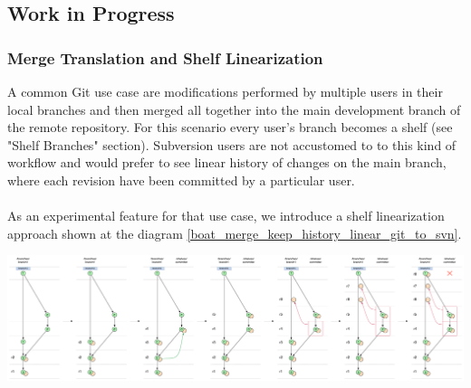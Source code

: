 \subsection{Work in Progress}

\subsubsection{Merge Translation and Shelf Linearization}

A common Git use case are modifications performed by multiple users in their local branches and then merged all together into the main development branch of the remote repository. 
For this scenario every user's branch becomes a shelf (see "Shelf Branches" section). Subversion users are not accustomed to
to this kind of workflow and would prefer to see linear history of changes on the main branch, where each revision have been committed by a particular user.
\\\\
As an experimental feature for that use case, we introduce a shelf linearization approach shown at the diagram \ref{boat_merge_keep_history_linear_git_to_svn}.
\begin{center}
\includegraphics[width=\textwidth]{img/diagrams/boat_merge_keep_history_linear_git_to_svn.pdf}%
\label{boat_merge_keep_history_linear_git_to_svn}%
\end{center}

